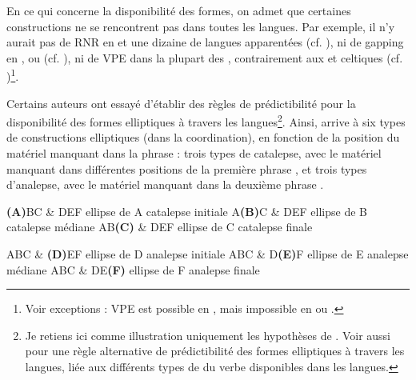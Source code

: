En ce qui concerne la disponibilité des formes, on admet que certaines constructions ne se rencontrent pas dans toutes les langues. Par exemple, il n’y aurait pas de RNR en  et une dizaine de langues apparentées (cf. \citealt{Koutsoudas1971}), ni de gapping en ,  ou  (cf. \citealt{Rosenbaum1977,MallinsonEtAl1981}), ni de VPE dans la plupart des , contrairement aux  et celtiques (cf. \citealt{Chao1988})\footnote{Voir exceptions : VPE est possible en , mais impossible en  ou .}. 

Certains auteurs ont essayé d’établir des règles de prédictibilité pour la disponibilité des formes elliptiques à travers les langues\footnote{Je retiens ici comme illustration uniquement les hypothèses de \citet{Sanders1977}. Voir aussi \citet{ZoernerEtAl2000} pour une règle alternative de prédictibilité des formes elliptiques à travers les langues, liée aux différents types de  du verbe disponibles dans les langues.}. Ainsi, \citet{Sanders1977} arrive à six types de constructions elliptiques (dans la coordination), en fonction de la position du matériel manquant dans la phrase : trois types de catalepse, avec le matériel manquant dans différentes positions de la première phrase , et trois types d’analepse, avec le matériel manquant dans la deuxième phrase .

\ea \label{ch1:ex93}
\ea  \textbf{(A)}BC \& DEF \hspace{10mm} ellipse de A \hspace{10mm} catalepse initiale  %
\ex  A\textbf{(B)}C \& DEF  \hspace{10mm} ellipse de B \hspace{10mm} catalepse médiane
\ex  AB\textbf{(C)} \& DEF \hspace{10mm} ellipse de C \hspace{10mm} catalepse finale  
\z
\z


\ea \label{ch1:ex94}
\ea  ABC \& \textbf{(D)}EF \hspace{10mm} ellipse de D \hspace{10mm} analepse initiale  %
\ex  ABC \& D\textbf{(E)}F \hspace{10mm} ellipse de E \hspace{10.7mm} analepse médiane
\ex  ABC \& DE\textbf{(F)} \hspace{10mm} ellipse de F \hspace{11mm} analepse finale 
\z
\z

